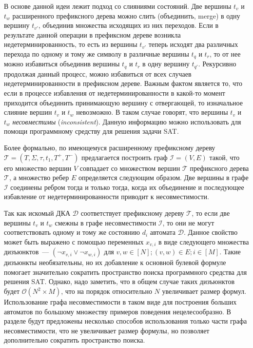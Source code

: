 В основе данной идеи лежит подход со слияниями состояний.
Две вершины $t_{v}$ и $t_{w}$ расширенного префиксного дерева можно слить (объединить, merge) в одну вершину $t_{v'}$, объединив множества исходящих из них переходов.
Если в результате данной операции в префиксном дереве возникла недетерминированность, то есть из вершины $t_{v'}$ теперь исходят два различных перехода по одному и тому же символу в различные вершины $t_{q}$ и $t_{r}$, то от нее можно избавиться объединив вершины $t_{q}$ и $t_{r}$ в одну вершину $t_{q'}$. 
Рекурсивно продолжая данный процесс, можно избавиться от всех случаев недетерминированности в префиксном дереве.
Важным фактом является то, что если в процессе избавления от недетерминированности в какой-то момент приходится объединить принимающую вершину с отвергающей, то изначальное слияние вершин $t_{v}$ и $t_{w}$ невозможно.
В таком случае говорят, что вершины $t_{v}$ и $t_{w}$ \emph{несовместимы} (\emph{inconsistent}).
Данную информацию можно использовать для помощи программному средству для решения задачи SAT.

Более формально, по имеющемуся расширенному префиксному дереву $\mathcal{T} = \left(T,\Sigma,\tau,t_{1},T^{+},T^{-}\right)$ предлагается построить граф $\mathcal{I} = \left(V, E\right)$ такой, что его множество вершин $V$ совпадает со множеством вершин $\mathcal{T}$ префиксного дерева $\mathcal{T}$, а множество ребер $E$ определяется следующим образом. 
Две вершины в графе $\mathcal{I}$ соединены ребром тогда и только тогда, когда их объединение и последующее избавление от недетерминированности приводит к несовместимости. 

Так как искомый ДКА $\mathcal{D}$ соответствует префиксному дереву $\mathcal{T}$, то если две вершины $t_{v}$ и $t_{w}$ смежны в графе несовместимости $\mathcal{I}$, то они не могут соответствовать одному и тому же состоянию $d_{i}$ автомата $\mathcal{D}$.
Данное свойство может быть выражено с помощью переменных $x_{v,i}$ в виде следующего множества дизъюнктов~{---} $\left(\neg x_{v,i} \vee \neg x_{w,i}\right)$ для $v,w \in \left[N\right]; \left(v,w\right) \in E; i \in \left[M\right]$.
Такие дизъюнкты необязательны, но их добавление к основной булевой формуле помогает значительно сократить пространство поиска программного средства для решения SAT. 
Однако, надо заметить, что в общем случае таких дизъюнктов будет $\mathcal{O}\left(N^{2} \times M\right)$, что на порядок относительно $N$ увеличивает размер формул. 
Использование графа несовместимости в таком виде для построения больших автоматов по большому множеству примеров поведения нецелесообразно. 
В разделе  будут предложены несколько способов использования только части графа несовместимости, что не увеличивает размер формулы, но позволяет дополнительно сократить пространство поиска.